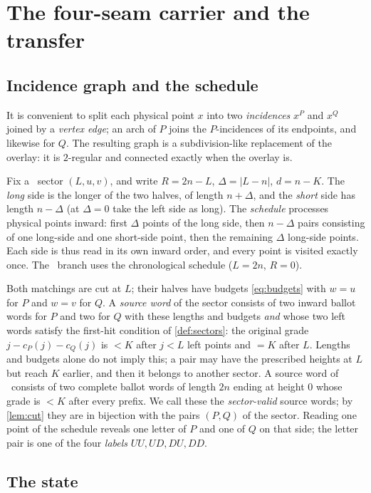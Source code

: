 \section{The four-seam carrier and the transfer}
\label{sec:carrier}

\subsection{Incidence graph and the schedule}

It is convenient to split each physical point $x$ into two \emph{incidences}
$x^{P}$ and $x^{Q}$ joined by a \emph{vertex edge}; an arch of $P$ joins the
$P$-incidences of its endpoints, and likewise for $Q$. The resulting graph is a
subdivision-like replacement of the overlay: it is $2$-regular and connected
exactly when the overlay is.

Fix a \HIGH\ sector $(L,u,v)$, and write $R=2n-L$, $\Delta=|L-n|$,
$d=n-K$. The \emph{long} side is the longer of the two halves, of length
$n+\Delta$, and the \emph{short} side has length $n-\Delta$ (at $\Delta=0$ take
the left side as long). The \emph{schedule} processes physical points inward:
first $\Delta$ points of the long side, then $n-\Delta$ pairs consisting of one
long-side and one short-side point, then the remaining $\Delta$ long-side
points. Each side is thus read in its own inward order, and every point is
visited exactly once. The \LOW\ branch uses the chronological schedule
($L=2n$, $R=0$).

Both matchings are cut at $L$; their halves have budgets
\eqref{eq:budgets} with $w=u$ for $P$ and $w=v$ for $Q$.
A \emph{source word} of the sector consists of two inward ballot words for $P$
and two for $Q$ with these lengths and budgets \emph{and} whose two left words
satisfy the first-hit condition of \cref{def:sectors}: the original grade
$j-c_P(j)-c_Q(j)$ is $<K$ after $j<L$ left points and $=K$ after $L$. Lengths
and budgets alone do not imply this; a pair may have the prescribed heights at
$L$ but reach $K$ earlier, and then it belongs to another sector. A source
word of \LOW\ consists of two complete ballot words of length $2n$ ending at
height $0$ whose grade is $<K$ after every prefix. We call these the
\emph{sector-valid} source words; by \cref{lem:cut} they are in bijection with
the pairs $(P,Q)$ of the sector. Reading one point of the
schedule reveals one letter of $P$ and one of $Q$ on that side; the letter pair
is one of the four \emph{labels} $UU,UD,DU,DD$.

\subsection{The state}

